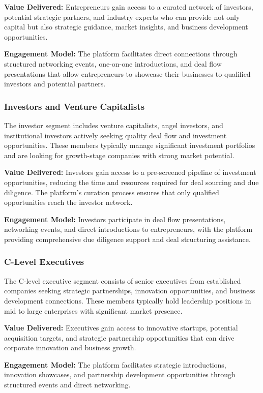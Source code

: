 \textbf{Value Delivered:} Entrepreneurs gain access to a curated network of investors, potential strategic partners, and industry experts who can provide not only capital but also strategic guidance, market insights, and business development opportunities.

\textbf{Engagement Model:} The platform facilitates direct connections through structured networking events, one-on-one introductions, and deal flow presentations that allow entrepreneurs to showcase their businesses to qualified investors and potential partners.

\subsubsection{Investors and Venture Capitalists}
The investor segment includes venture capitalists, angel investors, and institutional investors actively seeking quality deal flow and investment opportunities. These members typically manage significant investment portfolios and are looking for growth-stage companies with strong market potential.

\textbf{Value Delivered:} Investors gain access to a pre-screened pipeline of investment opportunities, reducing the time and resources required for deal sourcing and due diligence. The platform's curation process ensures that only qualified opportunities reach the investor network.

\textbf{Engagement Model:} Investors participate in deal flow presentations, networking events, and direct introductions to entrepreneurs, with the platform providing comprehensive due diligence support and deal structuring assistance.

\subsubsection{C-Level Executives}
The C-level executive segment consists of senior executives from established companies seeking strategic partnerships, innovation opportunities, and business development connections. These members typically hold leadership positions in mid to large enterprises with significant market presence.

\textbf{Value Delivered:} Executives gain access to innovative startups, potential acquisition targets, and strategic partnership opportunities that can drive corporate innovation and business growth.

\textbf{Engagement Model:} The platform facilitates strategic introductions, innovation showcases, and partnership development opportunities through structured events and direct networking.

